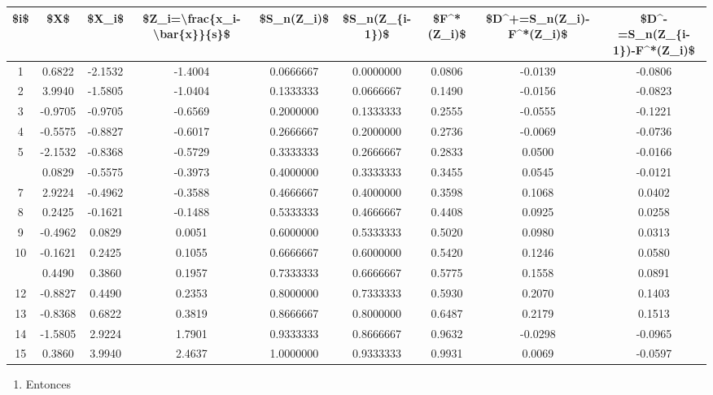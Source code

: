 \documentclass[
  a4paper,
  oneside,
  openany]{book}
\providecommand{\tightlist}{%
  \setlength{\itemsep}{0pt}\setlength{\parskip}{0pt}}
\begin{document}
\begin{table}
\centering
\begin{tabular}{ccccccccc}
\toprule
\$i\$ & \$X\$ & \$X\_i\$ & \$Z\_i=\textbackslash{}frac\{x\_i-\textbackslash{}bar\{x\}\}\{s\}\$ & \$S\_n(Z\_i)\$ & \$S\_n(Z\_\{i-1\})\$ & \$F\textasciicircum{}*(Z\_i)\$ & \$D\textasciicircum{}+=S\_n(Z\_i)-F\textasciicircum{}*(Z\_i)\$ & \$D\textasciicircum{}-=S\_n(Z\_\{i-1\})-F\textasciicircum{}*(Z\_i)\$\\
\midrule
1 & 0.6822 & -2.1532 & -1.4004 & 0.0666667 & 0.0000000 & 0.0806 & -0.0139 & -0.0806\\
2 & 3.9940 & -1.5805 & -1.0404 & 0.1333333 & 0.0666667 & 0.1490 & -0.0156 & -0.0823\\
3 & -0.9705 & -0.9705 & -0.6569 & 0.2000000 & 0.1333333 & 0.2555 & -0.0555 & -0.1221\\
4 & -0.5575 & -0.8827 & -0.6017 & 0.2666667 & 0.2000000 & 0.2736 & -0.0069 & -0.0736\\
5 & -2.1532 & -0.8368 & -0.5729 & 0.3333333 & 0.2666667 & 0.2833 & 0.0500 & -0.0166\\
\addlinespace
6 & 0.0829 & -0.5575 & -0.3973 & 0.4000000 & 0.3333333 & 0.3455 & 0.0545 & -0.0121\\
7 & 2.9224 & -0.4962 & -0.3588 & 0.4666667 & 0.4000000 & 0.3598 & 0.1068 & 0.0402\\
8 & 0.2425 & -0.1621 & -0.1488 & 0.5333333 & 0.4666667 & 0.4408 & 0.0925 & 0.0258\\
9 & -0.4962 & 0.0829 & 0.0051 & 0.6000000 & 0.5333333 & 0.5020 & 0.0980 & 0.0313\\
10 & -0.1621 & 0.2425 & 0.1055 & 0.6666667 & 0.6000000 & 0.5420 & 0.1246 & 0.0580\\
\addlinespace
11 & 0.4490 & 0.3860 & 0.1957 & 0.7333333 & 0.6666667 & 0.5775 & 0.1558 & 0.0891\\
12 & -0.8827 & 0.4490 & 0.2353 & 0.8000000 & 0.7333333 & 0.5930 & 0.2070 & 0.1403\\
13 & -0.8368 & 0.6822 & 0.3819 & 0.8666667 & 0.8000000 & 0.6487 & 0.2179 & 0.1513\\
14 & -1.5805 & 2.9224 & 1.7901 & 0.9333333 & 0.8666667 & 0.9632 & -0.0298 & -0.0965\\
15 & 0.3860 & 3.9940 & 2.4637 & 1.0000000 & 0.9333333 & 0.9931 & 0.0069 & -0.0597\\
\bottomrule
\end{tabular}
\end{table}

\begin{enumerate}
\def\labelenumi{\arabic{enumi})}
\setcounter{enumi}{8}
\tightlist
\item
  Entonces
\end{enumerate}
\end{document}
